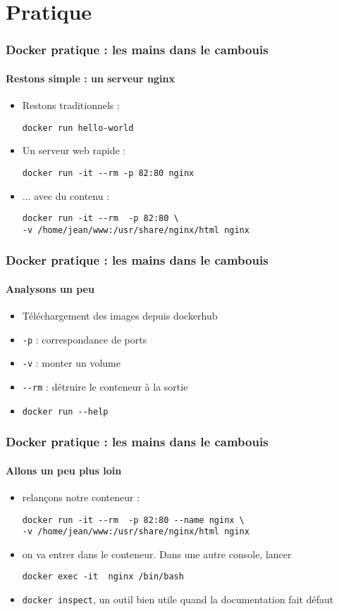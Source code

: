 \documentclass[11pt]{beamer}
\begin{document}
\section{Pratique}

\begin{frame}[fragile]
\frametitle{Docker pratique : les mains dans le cambouis }
\framesubtitle{Restons simple : un serveur nginx}
\begin{itemize}
	\item Restons traditionnels : 
	\begin{lstlisting}
docker run hello-world	
	\end{lstlisting}
	\item Un serveur web rapide : 
	\begin{lstlisting}
docker run -it --rm -p 82:80 nginx
	\end{lstlisting}
	\item ... avec du contenu : 
	\begin{lstlisting}
docker run -it --rm  -p 82:80 \
-v /home/jean/www:/usr/share/nginx/html nginx
	\end{lstlisting}
\end{itemize}
\end{frame}

\begin{frame}[fragile]
\frametitle{Docker pratique : les mains dans le cambouis }
\framesubtitle{Analysons un peu}
\begin{itemize}
	\item Téléchargement des images depuis dockerhub
	\item \verb|-p| : correspondance de ports
	\item \verb|-v| : monter un volume
	\item \verb|--rm| : détruire le conteneur à la sortie
	\item \verb|docker run --help|
\end{itemize}
\end{frame}

\begin{frame}[fragile]
\frametitle{Docker pratique : les mains dans le cambouis }
\framesubtitle{Allons un peu plus loin}
\begin{itemize}
	\item relançons notre conteneur : 
	\begin{lstlisting}
docker run -it --rm  -p 82:80 --name nginx \
-v /home/jean/www:/usr/share/nginx/html nginx
	\end{lstlisting}
	\item on va entrer dans le conteneur. Dans une autre console, lancer
	\begin{lstlisting}
docker exec -it  nginx /bin/bash
	\end{lstlisting}
	\item \verb|docker inspect|, un outil bien utile quand la documentation fait défaut
\end{itemize}
\end{frame}
\end{document}
